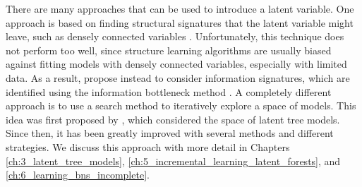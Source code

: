 There are many approaches that can be used to introduce a latent variable. One approach is based on finding structural signatures that the latent variable might leave, such as densely connected variables \citep{elidan2000}. Unfortunately, this technique does not perform too well, since structure learning algorithms are usually biased against fitting models with densely connected variables, especially with limited data. As a result, \cite{elidan2005} propose instead to consider information signatures, which are identified using the information bottleneck method \citep{tishby1999, friedman2001_information}. A completely different approach is to use a search method to iteratively explore a space of models. This idea was first proposed by \cite{zhang2004_hlcm}, which considered the space of latent tree models. Since then, it has been greatly improved with several methods and different strategies. We discuss this approach with more detail in Chapters \ref{ch:3_latent_tree_models}, \ref{ch:5_incremental_learning_latent_forests}, and \ref{ch:6_learning_bns_incomplete}.










